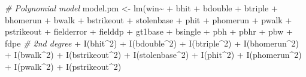 \documentclass[
]{article}
\newenvironment{Shaded}{\begin{snugshade}}{\end{snugshade}}
\newcommand{\CommentTok}[1]{\textcolor[rgb]{0.56,0.35,0.01}{\textit{#1}}}
\newcommand{\DecValTok}[1]{\textcolor[rgb]{0.00,0.00,0.81}{#1}}
\newcommand{\FunctionTok}[1]{\textcolor[rgb]{0.00,0.00,0.00}{#1}}
\newcommand{\NormalTok}[1]{#1}
\newcommand{\OtherTok}[1]{\textcolor[rgb]{0.56,0.35,0.01}{#1}}
\newcommand{\SpecialCharTok}[1]{\textcolor[rgb]{0.00,0.00,0.00}{#1}}
\begin{document}
\begin{Shaded}
\begin{Highlighting}[]
\CommentTok{\# Polynomial model}
\NormalTok{model.pm }\OtherTok{\textless{}{-}} \FunctionTok{lm}\NormalTok{(win}\SpecialCharTok{\textasciitilde{}} 
               \SpecialCharTok{+}\NormalTok{ bhit}
               \SpecialCharTok{+}\NormalTok{ bdouble }
               \SpecialCharTok{+}\NormalTok{ btriple }
               \SpecialCharTok{+}\NormalTok{ bhomerun }
               \SpecialCharTok{+}\NormalTok{ bwalk }
               \SpecialCharTok{+}\NormalTok{ bstrikeout }
               \SpecialCharTok{+}\NormalTok{ stolenbase }
               \SpecialCharTok{+}\NormalTok{ phit }
               \SpecialCharTok{+}\NormalTok{ phomerun }
               \SpecialCharTok{+}\NormalTok{ pwalk }
               \SpecialCharTok{+}\NormalTok{ pstrikeout }
               \SpecialCharTok{+}\NormalTok{ fielderror }
               \SpecialCharTok{+}\NormalTok{ fielddp }
               \SpecialCharTok{+}\NormalTok{ gt1base }
               \SpecialCharTok{+}\NormalTok{ bsingle }
               \SpecialCharTok{+}\NormalTok{ pbh }
               \SpecialCharTok{+}\NormalTok{ pbhr }
               \SpecialCharTok{+}\NormalTok{ pbw }
               \SpecialCharTok{+}\NormalTok{ fdpe }
               \CommentTok{\# 2nd degree}
               \SpecialCharTok{+} \FunctionTok{I}\NormalTok{(bhit}\SpecialCharTok{\^{}}\DecValTok{2}\NormalTok{)}
               \SpecialCharTok{+} \FunctionTok{I}\NormalTok{(bdouble}\SpecialCharTok{\^{}}\DecValTok{2}\NormalTok{) }
               \SpecialCharTok{+} \FunctionTok{I}\NormalTok{(btriple}\SpecialCharTok{\^{}}\DecValTok{2}\NormalTok{) }
               \SpecialCharTok{+} \FunctionTok{I}\NormalTok{(bhomerun}\SpecialCharTok{\^{}}\DecValTok{2}\NormalTok{) }
               \SpecialCharTok{+} \FunctionTok{I}\NormalTok{(bwalk}\SpecialCharTok{\^{}}\DecValTok{2}\NormalTok{) }
               \SpecialCharTok{+} \FunctionTok{I}\NormalTok{(bstrikeout}\SpecialCharTok{\^{}}\DecValTok{2}\NormalTok{) }
               \SpecialCharTok{+} \FunctionTok{I}\NormalTok{(stolenbase}\SpecialCharTok{\^{}}\DecValTok{2}\NormalTok{) }
               \SpecialCharTok{+} \FunctionTok{I}\NormalTok{(phit}\SpecialCharTok{\^{}}\DecValTok{2}\NormalTok{) }
               \SpecialCharTok{+} \FunctionTok{I}\NormalTok{(phomerun}\SpecialCharTok{\^{}}\DecValTok{2}\NormalTok{) }
               \SpecialCharTok{+} \FunctionTok{I}\NormalTok{(pwalk}\SpecialCharTok{\^{}}\DecValTok{2}\NormalTok{) }
               \SpecialCharTok{+} \FunctionTok{I}\NormalTok{(pstrikeout}\SpecialCharTok{\^{}}\DecValTok{2}\NormalTok{) }

\end{Highlighting}
\end{Shaded}
\end{document}
